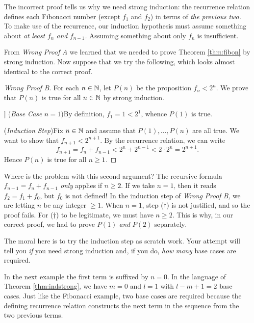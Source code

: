 The incorrect proof tells us why we need strong induction: the recurrence relation defines each Fibonacci number (except $f_1$ and $f_2$) in terms of \emph{the previous two.} To make use of the recurrence, our induction hypothesis must assume something about \emph{at least $f_n$ and $f_{n-1}$.} Assuming something about only $f_n$ is insufficient.\par

From \emph{Wrong Proof A} we learned that we needed to prove Theorem \ref{thm:fibon} by strong induction. Now suppose that we try the following, which looks almost identical to the correct proof.

\begin{proof}[Wrong Proof B]
	For each $n\in\mathbb{N}$, let $P(n)$ be the proposition $f_n<2^n$. We prove that $P(n)$ is true for all $n\in\mathbb{N}$ by strong induction.\par]
	(\emph{Base Case} $n=1$)\quad By definition, $f_1=1<2^1$, whence $P(1)$ is true.\par
	(\emph{Induction Step})\quad Fix $n\in\mathbb{N}$ and assume that $P(1),\ldots,P(n)$ are all true. We want to show that $f_{n+1}<2^{n+1}$. By the recurrence relation, we can write
	\[
		f_{n+1}=f_n+f_{n-1}<2^n+2^{n-1}<2\cdot 2^n=2^{n+1}.\tag*{($\dag$)}
	\]
	Hence $P(n)$ is true for all $n\ge 1$.
\end{proof}

Where is the problem with this second argument? The recursive formula $f_{n+1}=f_n+f_{n-1}$ \emph{only} applies if $n\ge 2$. If we take $n=1$, then it reads $f_2=f_1+f_0$, but $f_0$ is not defined! In the induction step of \emph{Wrong Proof B,} we are letting $n$ be any integer $\ge 1$. When $n=1$, step ($\dag$) is not justified, and so the proof fails. For ($\dag$) to be legitimate, we must have $n\ge 2$. This is why, in our correct proof, we had to prove $P(1)$ \emph{and} $P(2)$ separately.\par

The moral here is to try the induction step as scratch work. Your attempt will tell you \emph{if} you need strong induction and, if you do, \emph{how many} base cases are required.



In the next example the first term is suffixed by $n=0$. In the language of Theorem \ref{thm:indstrong}, we have $m=0$ and $l=1$ with $l-m+1=2$ base cases. Just like the Fibonacci example, two base cases are required because the defining recurrence relation constructs the next term in the sequence from the two previous terms.

